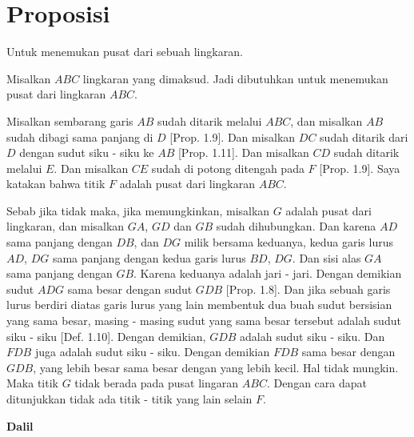 \documentclass[a4paper]{book}
\begin{document}
\section*{\centering Proposisi \thesection}
Untuk menemukan pusat dari sebuah lingkaran.
\begin{center}
\end{center}
Misalkan $ABC$ lingkaran yang dimaksud. Jadi dibutuhkan untuk menemukan pusat
dari lingkaran $ABC$.

Misalkan sembarang garis $AB$ sudah ditarik melalui $ABC$, dan misalkan $AB$
sudah dibagi sama panjang di $D$ [Prop. 1.9]. Dan misalkan $DC$ sudah
ditarik dari $D$ dengan sudut siku - siku ke $AB$ [Prop. 1.11]. Dan misalkan
$CD$ sudah ditarik melalui $E$. Dan misalkan $CE$ sudah di potong ditengah pada
$F$ [Prop. 1.9]. Saya katakan bahwa titik $F$ adalah pusat dari lingkaran $ABC$.

Sebab jika tidak maka, jika memungkinkan, misalkan $G$ adalah pusat dari 
lingkaran, dan misalkan $GA$, $GD$ dan $GB$ sudah dihubungkan. Dan karena $AD$
sama panjang dengan $DB$, dan $DG$ milik bersama keduanya, kedua garis lurus
$AD$, $DG$ sama panjang dengan kedua garis lurus $BD$, $DG$. Dan sisi alas $GA$
sama panjang dengan $GB$. Karena keduanya adalah jari - jari. 
Dengan demikian sudut $ADG$ sama besar dengan sudut $GDB$
[Prop. 1.8]. Dan jika sebuah garis lurus berdiri diatas garis lurus yang lain
membentuk dua buah sudut bersisian yang sama besar, masing - masing sudut yang
sama besar tersebut adalah sudut siku - siku [Def. 1.10]. Dengan demikian, 
$GDB$ adalah sudut siku - siku. Dan $FDB$ juga adalah sudut siku - siku. Dengan
demikian $FDB$ sama besar dengan $GDB$, yang lebih besar sama besar dengan yang
lebih kecil. Hal tidak mungkin. Maka titik $G$ tidak berada pada pusat 
lingaran $ABC$. Dengan cara dapat ditunjukkan tidak ada  titik - titik yang 
lain selain $F$.


\begin{center}\textbf{Dalil}\end{center}
\end{document}
